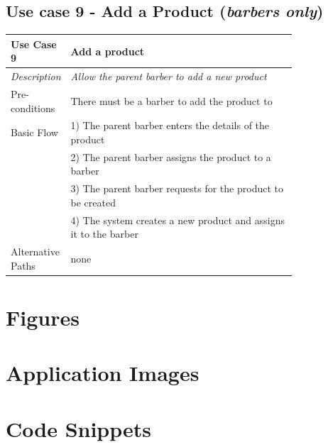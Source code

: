 \documentclass[12pt]{article}
\begin{document}
	\subsection{Use case 9 - Add a Product (\emph{barbers only})}
	\label{chap:use-cases-9}
	\begin{table}[H]
		\begin{tabular}{|l|p{0.8\linewidth}}
			\hline
			\rowcolor[HTML]{EFEFEF} 
			\textbf{Use Case 9}  & \textbf{Add a product}                                           \\ \hline
			\rowcolor[HTML]{F5FBFF} 
			\textit{Description} & \textit{Allow the parent barber to add a new product}            \\ \hline
			\rowcolor[HTML]{EFEFEF} 
			Pre-conditions       & There must be a barber to add the product to                     \\ \hline
			\rowcolor[HTML]{F5FBFF} 
			Basic Flow           & 1) The parent barber enters the details of the product           \\
			\rowcolor[HTML]{F5FBFF} 
			& 2) The parent barber assigns the product to a barber             \\
			\rowcolor[HTML]{F5FBFF} 
			& 3) The parent barber requests for the product to be created      \\
			\rowcolor[HTML]{F5FBFF} 
			& 4) The system creates a new product and assigns it to the barber \\ \hline
			\rowcolor[HTML]{EFEFEF} 
			Alternative Paths    & none                                                            
		\end{tabular}
	\end{table}
	

	\section{Figures}
	
	\section{Application Images}
	\section{Code Snippets}
\end{document}
